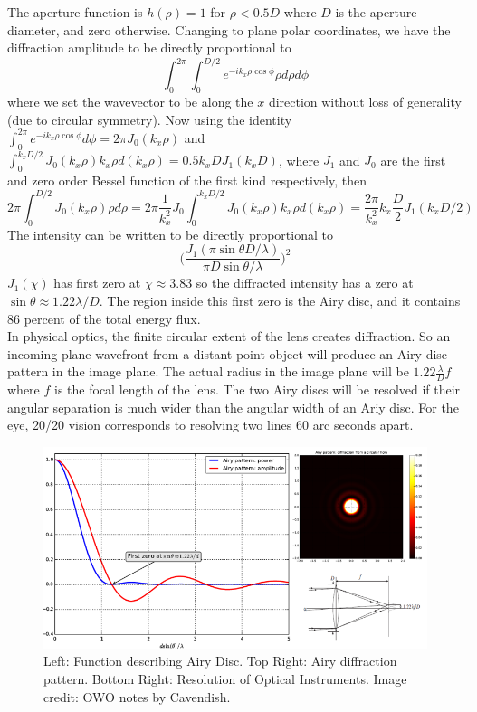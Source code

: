 \documentclass[a4paper]{article}
\begin{document}
\begin{eg}
The aperture function is $h(\rho)=1$ for $\rho<0.5D$ where $D$ is the aperture diameter, and zero otherwise. 
Changing to plane polar coordinates, we have the diffraction amplitude to be directly proportional to
$$\int_0^{2\pi}\int_0^{D/2}e^{-ik_x\rho\cos\phi}\rho d\rho d\phi$$
where we set the wavevector to be along the $x$ direction without loss of generality (due to circular symmetry). Now using the identity $\int_0^{2\pi}e^{-ik_x\rho\cos\phi}d\phi=2\pi J_0(k_x\rho)$ and $\int_0^{k_xD/2}J_0(k_x\rho)k_x\rho d(k_x\rho)=0.5k_xDJ_1(k_xD)$, where $J_1$ and $J_0$ are the first and zero order Bessel function of the first kind respectively, then 
$$2\pi\int_0^{D/2}J_0(k_x\rho)\rho d\rho=2\pi\frac{1}{k_x^2}J_0\int_0^{k_xD/2}J_0(k_x\rho)k_x\rho d(k_x\rho)=\frac{2\pi}{k_x^2}k_x\frac{D}{2}J_1(k_xD/2)$$
The intensity can be written to be directly proportional to 
$$\bigg(\frac{J_1(\pi\sin\theta D/\lambda)}{\pi D\sin\theta/\lambda}\bigg)^2$$
$J_1(\chi)$ has first zero at $\chi\approx3.83$ so the diffracted intensity has a zero at $\sin\theta\approx1.22\lambda/D$. The region inside this first zero is the Airy disc, and it contains 86 percent of the total energy flux.\\[5pt]
In physical optics, the finite circular extent of the lens creates diffraction. So an incoming plane wavefront from a distant point object will produce an Airy disc pattern in the image plane. The actual radius in the image plane will be $1.22\frac{\lambda}{D}f$ where $f$ is the focal length of the lens. The two Airy discs will be resolved if their angular separation is much wider than the angular width of an Ariy disc. For the eye, 20/20 vision corresponds to resolving two lines 60 arc seconds apart.
\end{eg}
\begin{figure}[H]
    \centering
    \includegraphics[width=\linewidth]{circularaperture.PNG}
    \caption{Left: Function describing Airy Disc. Top Right: Airy diffraction pattern. Bottom Right: Resolution of Optical Instruments. Image credit: OWO notes by Cavendish.}
\end{figure}
\end{document}
